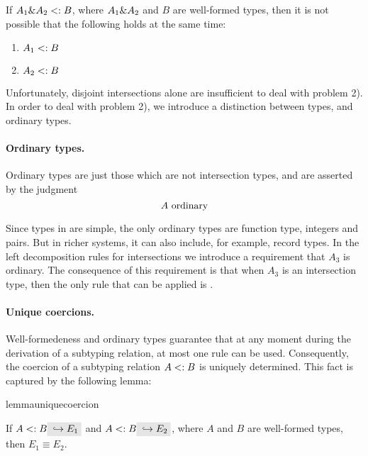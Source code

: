 \begin{lemma}
  \label{lemma:unique-subtype-contributor}

  If $A_1 \& A_2 <: B$, where $A_1 \& A_2$ and $B$ are well-formed types,
  then it is not possible that the following holds at the same time:
  \begin{enumerate}
    \item $A_1 <: B$
    \item $A_2 <: B$
  \end{enumerate}
\end{lemma}

Unfortunately, disjoint intersections alone are insufficient to deal with
problem 2). In order to deal with problem 2), we introduce a distinction between
types, and ordinary types.

\paragraph{Ordinary types.} Ordinary types are just those which are not intersection
types, and are asserted by the judgment \[ A \ \textnormal{ordinary} \]

\noindent Since types in \name are simple, the only ordinary types are 
function type, integers and pairs.
But in richer systems, it can also include, for example, record types.
In the left decomposition rules for intersections we introduce a requirement
that $A_3$ is ordinary. The consequence of this requirement is that when $A_3$ is
an intersection type, then the only rule that can be applied is
. 

\paragraph{Unique coercions.}
Well-formedeness and ordinary types guarantee that at
any moment during the derivation of a subtyping relation, at most one rule can
be used. Consequently, the coercion of a subtyping relation $A <: B$ is
uniquely determined. This fact is captured by the following lemma:

\begin{restatable}{lemma}{uniquecoercion}
  \label{lemma:unique-coercion}

  If $A \subtype B \yields {E_1}$ and $A \subtype B \yields {E_2}$, where $A$
  and $B$ are well-formed types, then $E_1 \equiv E_2$.
\end{restatable}

